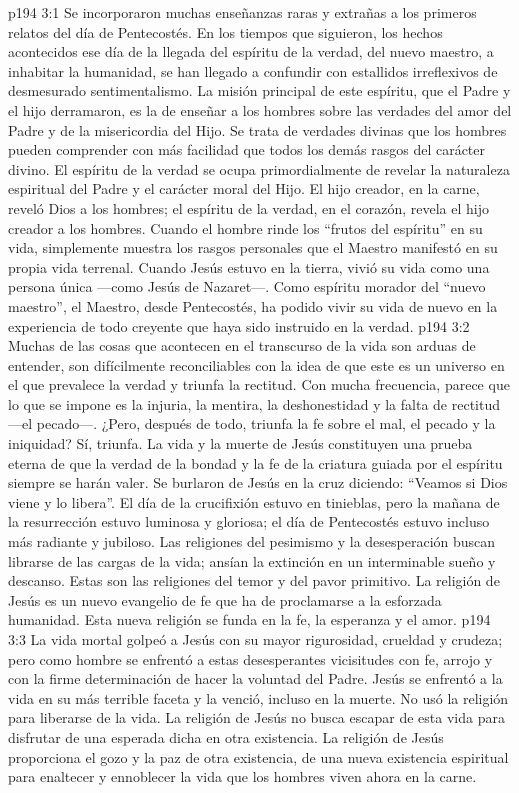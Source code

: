 \vs p194 3:1 Se incorporaron muchas enseñanzas raras y extrañas a los primeros relatos del día de Pentecostés. En los tiempos que siguieron, los hechos acontecidos ese día de la llegada del espíritu de la verdad, del nuevo maestro, a inhabitar la humanidad, se han llegado a confundir con estallidos irreflexivos de desmesurado sentimentalismo. La misión principal de este espíritu, que el Padre y el hijo derramaron, es la de enseñar a los hombres sobre las verdades del amor del Padre y de la misericordia del Hijo. Se trata de verdades divinas que los hombres pueden comprender con más facilidad que todos los demás rasgos del carácter divino. El espíritu de la verdad se ocupa primordialmente de revelar la naturaleza espiritual del Padre y el carácter moral del Hijo. El hijo creador, en la carne, reveló Dios a los hombres; el espíritu de la verdad, en el corazón, revela el hijo creador a los hombres. Cuando el hombre rinde los “frutos del espíritu” en su vida, simplemente muestra los rasgos personales que el Maestro manifestó en su propia vida terrenal. Cuando Jesús estuvo en la tierra, vivió su vida como una persona única ---como Jesús de Nazaret---. Como espíritu morador del “nuevo maestro”, el Maestro, desde Pentecostés, ha podido vivir su vida de nuevo en la experiencia de todo creyente que haya sido instruido en la verdad.
\vs p194 3:2 Muchas de las cosas que acontecen en el transcurso de la vida son arduas de entender, son difícilmente reconciliables con la idea de que este es un universo en el que prevalece la verdad y triunfa la rectitud. Con mucha frecuencia, parece que lo que se impone es la injuria, la mentira, la deshonestidad y la falta de rectitud ---el pecado---. ¿Pero, después de todo, triunfa la fe sobre el mal, el pecado y la iniquidad? Sí, triunfa. La vida y la muerte de Jesús constituyen una prueba eterna de que la verdad de la bondad y la fe de la criatura guiada por el espíritu siempre se harán valer. Se burlaron de Jesús en la cruz diciendo: “Veamos si Dios viene y lo libera”. El día de la crucifixión estuvo en tinieblas, pero la mañana de la resurrección estuvo luminosa y gloriosa; el día de Pentecostés estuvo incluso más radiante y jubiloso. Las religiones del pesimismo y la desesperación buscan librarse de las cargas de la vida; ansían la extinción en un interminable sueño y descanso. Estas son las religiones del temor y del pavor primitivo. La religión de Jesús es un nuevo evangelio de fe que ha de proclamarse a la esforzada humanidad. Esta nueva religión se funda en la fe, la esperanza y el amor.
\vs p194 3:3 La vida mortal golpeó a Jesús con su mayor rigurosidad, crueldad y crudeza; pero como hombre se enfrentó a estas desesperantes vicisitudes con fe, arrojo y con la firme determinación de hacer la voluntad del Padre. Jesús se enfrentó a la vida en su más terrible faceta y la venció, incluso en la muerte. No usó la religión para liberarse de la vida. La religión de Jesús no busca escapar de esta vida para disfrutar de una esperada dicha en otra existencia. La religión de Jesús proporciona el gozo y la paz de otra existencia, de una nueva existencia espiritual para enaltecer y ennoblecer la vida que los hombres viven ahora en la carne.
